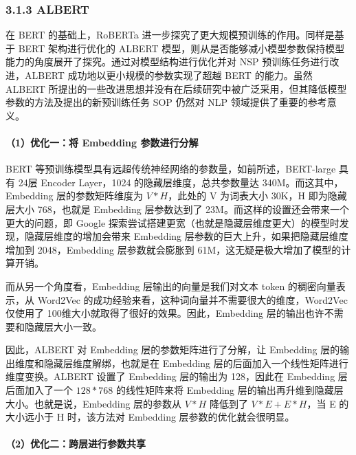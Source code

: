 \documentclass[
]{article}
\begin{document}
\subsubsection{3.1.3 ALBERT}\label{albert}

在 BERT 的基础上，RoBERTa 进一步探究了更大规模预训练的作用。同样是基于
BERT 架构进行优化的 ALBERT
模型，则从是否能够减小模型参数保持模型能力的角度展开了探究。通过对模型结构进行优化并对
NSP 预训练任务进行改进，ALBERT 成功地以更小规模的参数实现了超越 BERT
的能力。虽然 ALBERT
所提出的一些改进思想并没有在后续研究中被广泛采用，但其降低模型参数的方法及提出的新预训练任务
SOP 仍然对 NLP 领域提供了重要的参考意义。

\paragraph{（1）优化一：将 Embedding
参数进行分解}\label{ux4f18ux5316ux4e00ux5c06-embedding-ux53c2ux6570ux8fdbux884cux5206ux89e3}

BERT 等预训练模型具有远超传统神经网络的参数量，如前所述，BERT-large 具有
24层 Encoder Layer，1024 的隐藏层维度，总共参数量达
340M。而这其中，Embedding 层的参数矩阵维度为 \(V*H\)，此处的 V
为词表大小 30K，H 即为隐藏层大小 768，也就是 Embedding 层参数达到了
23M。而这样的设置还会带来一个更大的问题，即 Google
探索尝试搭建更宽（也就是隐藏层维度更大）的模型时发现，隐藏层维度的增加会带来
Embedding 层参数的巨大上升，如果把隐藏层维度增加到 2048，Embedding
层参数就会膨胀到 61M，这无疑是极大增加了模型的计算开销。

而从另一个角度看，Embedding 层输出的向量是我们对文本 token
的稠密向量表示，从 Word2Vec
的成功经验来看，这种词向量并不需要很大的维度，Word2Vec 仅使用了
100维大小就取得了很好的效果。因此，Embedding
层的输出也许不需要和隐藏层大小一致。

因此，ALBERT 对 Embedding 层的参数矩阵进行了分解，让 Embedding
层的输出维度和隐藏层维度解绑，也就是在 Embedding
层的后面加入一个线性矩阵进行维度变换。ALBERT 设置了 Embedding 层的输出为
128，因此在 Embedding 层后面加入了一个 \(128*768\) 的线性矩阵来将
Embedding 层的输出再升维到隐藏层大小。也就是说，Embedding 层的参数从
\(V*H\) 降低到了 \(V*E + E*H\)，当 E 的大小远小于 H 时，该方法对
Embedding 层参数的优化就会很明显。

\paragraph{（2）优化二：跨层进行参数共享}\label{ux4f18ux5316ux4e8cux8de8ux5c42ux8fdbux884cux53c2ux6570ux5171ux4eab}
\end{document}
